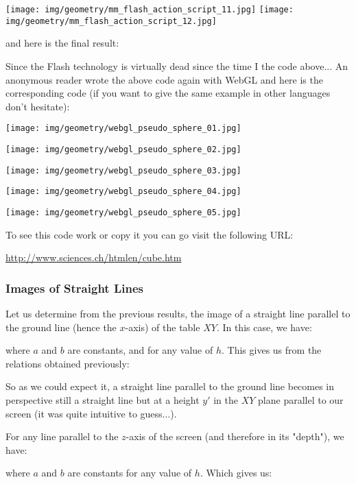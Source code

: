 	\begin{tcolorbox}[colframe=black,colback=white,sharp corners]
	\texttt{[image: img/geometry/mm\_flash\_action\_script\_11.jpg]}
	\texttt{[image: img/geometry/mm\_flash\_action\_script\_12.jpg]}
	
	and here is the final result:
	\begin{center}
	\centering
	\end{center}
	\end{tcolorbox}
	Since the Flash technology is virtually dead since the time I the code above... An anonymous reader wrote the above code again with WebGL and here is the corresponding code (if you want to give the same example in other languages don't hesitate):
	
	\texttt{[image: img/geometry/webgl\_pseudo\_sphere\_01.jpg]}
	
	\texttt{[image: img/geometry/webgl\_pseudo\_sphere\_02.jpg]}
	
	\texttt{[image: img/geometry/webgl\_pseudo\_sphere\_03.jpg]}
	
	\texttt{[image: img/geometry/webgl\_pseudo\_sphere\_04.jpg]}
	
	\texttt{[image: img/geometry/webgl\_pseudo\_sphere\_05.jpg]}
	
	To see this code work or copy it you can go visit the following URL:
	\begin{center}
	\url{http://www.sciences.ch/htmlen/cube.htm}
	\end{center}
	
	\subsubsection{Images of Straight Lines}
	Let us determine from the previous results, the image of a straight line parallel to the ground line (hence the $x$-axis) of the table $XY$. In this case, we have:
	
	where $a$ and $b$ are constants, and for any value of $h$. This gives us from the relations obtained previously:
	
	So as we could expect it, a straight line parallel to the ground line becomes in perspective still a straight line but at a height $y'$ in the $XY$ plane parallel to our screen (it was quite intuitive to guess...).

	For any line parallel to the $z$-axis of the screen (and therefore in its "depth"), we have:
	
	where $a$ and $b$ are constants for any value of $h$. Which gives us:
	
